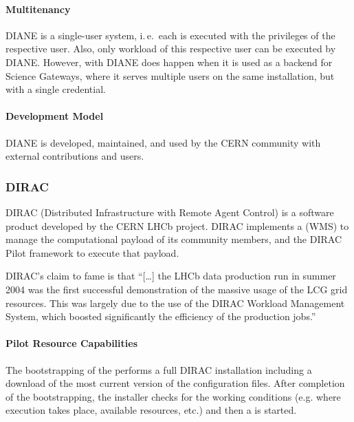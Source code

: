 \documentclass{sig-alternate}
\begin{document}
\paragraph{Multitenancy}
DIANE is a single-user \pilot system, i.\,e.\ each \pilot is executed with the
privileges of the respective user. Also, only workload of this respective user
can be executed by DIANE. However,  with DIANE does happen
when it is used as a backend for Science Gateways, where it serves multiple
users on the same installation, but with a single credential.

\paragraph{Development Model}
DIANE is developed, maintained, and used by the CERN community with external
contributions and users.

%
%
\subsubsection{DIRAC}
\label{sec:dirac}

DIRAC (Distributed Infrastructure with Remote Agent Control) is a software
product developed by the CERN LHCb project\cite{diracgrid2004}. DIRAC
implements a  (WMS) to manage the
computational payload of its community members, and the DIRAC Pilot framework
to execute that payload.

DIRAC's claim to fame is that ``[\ldots] the LHCb data production run in summer
2004 was the first successful demonstration of the massive usage of the LCG
grid resources. This was largely due to the use of the DIRAC Workload
Management System, which boosted significantly the efficiency of the production
jobs.''~\cite{Tsaregorodtsev:2010cj}

\paragraph{Pilot Resource Capabilities}

The bootstrapping of the  performs a full DIRAC
installation including a download of the most current version of the
configuration files. After completion of the bootstrapping, the installer
checks for the working conditions (e.g. where execution takes place, available
resources, etc.) and then a  is started.
\end{document}
